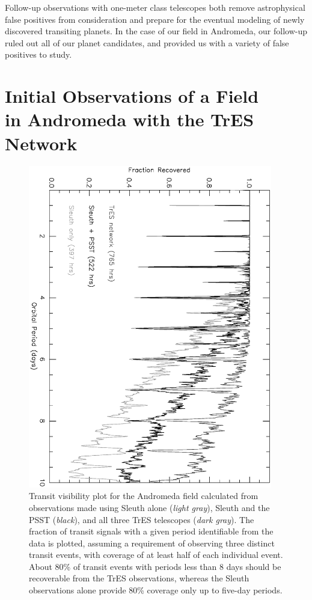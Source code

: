 Follow-up observations with one-meter class telescopes both remove astrophysical false positives from consideration and prepare for the eventual modeling of newly discovered transiting planets. In the case of our field in Andromeda, our follow-up ruled out all of our planet candidates, and provided us with a variety of false positives to study.

\section[Initial Observations of a Field in Andromeda]{Initial Observations of a Field \\ in Andromeda with the TrES Network}
\label{cha:and0:sec:obs}

\begin{figure}
\begin{center}
\includegraphics[angle=90, width=0.95\textwidth]{2_f1}
\caption[Fraction of potential transit signals identifiable from And0 data]{Transit visibility plot for the Andromeda field calculated from observations made using Sleuth alone (\textit{light gray}), Sleuth and the PSST (\textit{black}), and all three TrES telescopes (\textit{dark gray}). The fraction of transit signals with a given period identifiable from the data is plotted, assuming a requirement of observing three distinct transit events, with coverage of at least half of each individual event. About 80\% of transit events with periods less than 8 days should be recoverable from the TrES observations, whereas the Sleuth observations alone provide 80\% coverage only up to five-day periods.}
\label{cha:and0:fig:vis}
\end{center}
\end{figure}

